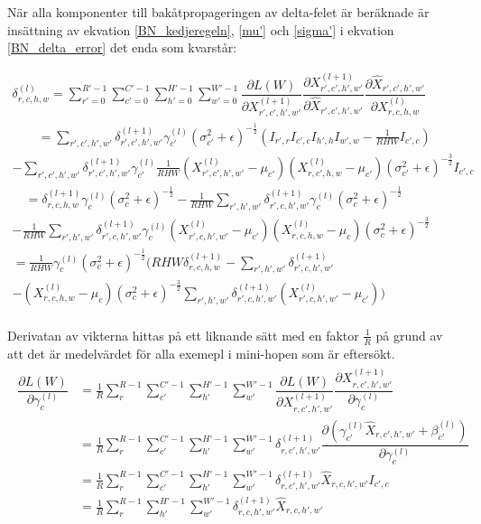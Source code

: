 \documentclass[a4paper,11pt,twoside]{article}
\newcommand*{\pd}[2]{\ensuremath{\dfrac{\partial #1}{\partial #2}}}
\begin{document}
När alla komponenter till bakåtpropageringen av delta-felet är beräknade är insättning av ekvation \eqref{BN_kedjeregeln}, \eqref{mu'} och \eqref{sigma'} i ekvation \eqref{BN_delta_error} det enda som kvarstår:

\begin{multline}
	\delta^{(l)}_{r,c,h,w} = \sum^{R'-1}_{r'=0} \sum^{C'-1}_{c'=0} \sum^{H'-1}_{h'=0} \sum^{W'-1}_{w'=0} \pd{L(W)}{X^{(l+1)}_{r',c',h',w'}} \pd{X^{(l+1)}_{r',c',h',w'}}{\hat{X}_{r',c',h',w'}} \pd{\hat{X}_{r',c',h',w'}}{{X}^{(l)}_{r,c,h,w}}\\
		\qquad = \sum\limits_{r',c',h',w'}\delta^{(l+1)}_{r',c',h',w'} \gamma^{(l)}_{c'} {(\sigma^2_{c'} + \epsilon)}^{-\frac{1}{2}} (I_{r',r} I_{c',c} I_{h',h} I_{w',w} - \frac{1}{RHW} I_{c',c}) \\
	-\sum\limits_{r',c',h',w'}\delta^{(l+1)}_{r',c',h',w'} \gamma^{(l)}_{c'} \frac{1}{RHW} ({X^{(l)}_{r',c',h',w'} - \mu_{c'}})({X^{(l)}_{r,c',h,w} - \mu_{c'}}) {(\sigma^2_{c'} + \epsilon)}^{-\frac{3}{2}} I_{c',c} \\
	\quad = \delta^{(l+1)}_{r,c,h,w} \gamma^{(l)}_{c} {(\sigma^2_{c} + \epsilon)}^{-\frac{1}{2}} - \frac{1}{RHW} \sum\limits_{r',h',w'} \delta^{(l+1)}_{r',c,h',w'} \gamma^{(l)}_{c} {(\sigma^2_{c} + \epsilon)}^{-\frac{1}{2}}\\
	- \frac{1}{RHW} \sum\limits_{r',h',w'} \delta^{(l+1)}_{r',c,h',w'}\gamma^{(l)}_{c} ({X^{(l)}_{r',c,h',w'} - \mu_{c'}})({X^{(l)}_{r,c,h,w} - \mu_{c}}){(\sigma^2_{c} + \epsilon)}^{-\frac{3}{2}} \\
	= \frac{1}{RHW} \gamma^{(l)}_c {(\sigma^2_{c} + \epsilon)}^{-\frac{1}{2}} \biggl(    RHW \delta^{(l+1)}_{r,c,h,w} -  \sum\limits_{r',h',w'} \delta^{(l+1)}_{r',c,h',w'} \qquad \\
	-  ({X^{(l)}_{r,c,h,w} - \mu_{c}}) {(\sigma^2_{c} + \epsilon)}^{-\frac{3}{2}} \sum\limits_{r',h',w'} \delta^{(l+1)}_{r',c,h',w'} ({X^{(l)}_{r',c,h',w'} - \mu_{c'}}) \biggl) \\
\end{multline}

Derivatan av vikterna hittas på ett liknande sätt med en faktor $\frac{1}{R}$ på grund av att det är medelvärdet för alla exemepl i mini-hopen som är eftersökt. \cite{webBN1} \cite{webBN2}
\begin{align}
\begin{split}
	\pd{L(W)}{\gamma^{(l)}_{c}}
		& = \frac{1}{R}\sum^{R-1}_{r} \sum^{C'-1}_{c'} \sum^{H'-1}_{h'} \sum^{W'-1}_{w'} \pd{L(W)}{X^{(l+1)}_{r,c',h',w'}} \pd{X^{(l+1)}_{r,c',h',w'}}{\gamma^{(l)}_{c}} \\
		& = \frac{1}{R}\sum^{R-1}_{r} \sum^{C'-1}_{c'} \sum^{H'-1}_{h'} \sum^{W'-1}_{w'} \delta^{(l+1)}_{r,c',h',w'}  \pd{({\gamma_{c'}^{(l)} \hat{X}_{r,c',h',w'} + \beta_{c'}^{(l)}})}{\gamma^{(l)}_{c}} \\
		& = \frac{1}{R}\sum^{R-1}_{r} \sum^{C'-1}_{c'} \sum^{H'-1}_{h'} \sum^{W'-1}_{w'} \delta^{(l+1)}_{r,c',h',w'} \hat{X}_{r,c,h',w'} I_{c',c}\\
		& = \frac{1}{R}\sum^{R-1}_{r} \sum^{H'-1}_{h'} \sum^{W'-1}_{w'} \delta^{(l+1)}_{r,c,h',w'} \hat{X}_{r,c,h',w'} \\
\end{split}
\end{align}
\end{document}
